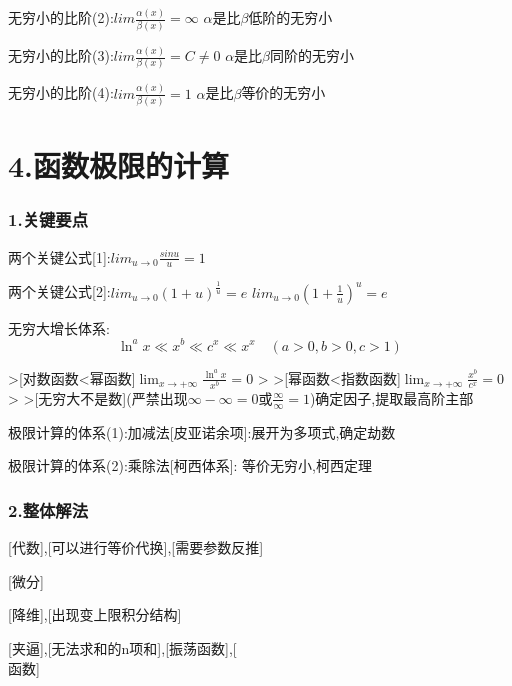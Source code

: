 \documentclass[11pt,a4paper,UTF8]{ctexart}
\begin{document}
    无穷小的比阶(2):$lim\frac{\alpha(x)}{\beta(x)}=\infty$	$\alpha$是比$\beta$低阶的无穷小

    无穷小的比阶(3):$lim\frac{\alpha(x)}{\beta(x)}=C\not=0$ $\alpha$是比$\beta$同阶的无穷小

    无穷小的比阶(4):$lim\frac{\alpha(x)}{\beta(x)}=1$  $\alpha$是比$\beta$等价的无穷小


\section{4.函数极限的计算}


\subsubsection{1.关键要点}

    两个关键公式[1]:$lim_{u\rightarrow 0}\frac{sinu}{u}=1$

    两个关键公式[2]:$lim_{u\rightarrow 0}(1+u)^{\frac{1}{u}}=e$	$lim_{u\rightarrow 0}(1+\frac{1}{u})^u=e$

    无穷大增长体系:
\begin{equation*}
\ln^a x \ll x^b \ll c^x \ll x^x \quad (a > 0, b > 0, c > 1)
\end{equation*}


\begin{solbox}[{分步推导与答题规范}]
    >[对数函数<幂函数]$\lim_{x \to +\infty} \frac{\ln^a x}{x^b} = 0$
    >
    >[幂函数<指数函数]$\lim_{x \to +\infty} \frac{x^b}{c^x} = 0$
    >
    >[无穷大不是数](严禁出现$\infty - \infty = 0$或$\frac{\infty}{\infty} = 1$)确定因子,提取最高阶主部
\end{solbox}

    极限计算的体系(1):加减法[皮亚诺余项]:展开为多项式,确定劫数

    极限计算的体系(2):乘除法[柯西体系]:  等价无穷小,柯西定理


\subsubsection{2.整体解法}

    [代数]\:[可以提取非0因子],[可以进行等价代换],[需要参数反推]

    [微分]

    [降维]\:[出现f(b)-f(a)结构],[出现变上限积分结构]

    [夹逼]\:[递推数列],[无法求和的n项和],[振荡函数],[
\begin{equation*}
[x]
\end{equation*}
函数]
\end{document}
